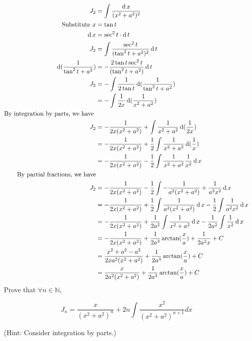 \documentclass{homework}
\newcommand{\?}{\stackrel{?}{=}}
\theoremstyle{definition}
\begin{document}
\begin{align*}
    J_2 &=\int \frac{\operatorname{d} x}{(x^2+a^2)^2}\\
    \text{Substitute } x&=\tan t\\
    \operatorname{d} x&=\sec^2 t \cdot \operatorname{d} t\\
    J_2&=\int \frac{\sec^2 t}{(\tan^2 t + a^2)^2}\operatorname{d} t\\
    \operatorname{d} (\frac{1}{\tan^2 t + a^2}) &= -\frac{2\tan t\sec^2 t}{(\tan^2 t + a^2)}\operatorname{d} t\\
    J_2&=-\int \frac{1}{2\tan t}\operatorname{d} (\frac{1}{\tan^2 t + a^2})\\
    &=-\int \frac{1}{2x}\operatorname{d} (\frac{1}{x^2+a^2})\\
    \text{By integration by parts, we have }&\\
    J_2&=-\frac{1}{2x(x^2+a^2)}+\int \frac{1}{x^2+a^2}\operatorname{d} (\frac{1}{2x})\\
    &=-\frac{1}{2x(x^2+a^2)}+\frac{1}{2}\int \frac{1}{x^2+a^2}\operatorname{d} (\frac{1}{x})\\
    &=-\frac{1}{2x(x^2+a^2)}-\frac{1}{2}\int \frac{1}{x^2+a^2}\frac{1}{x^2}\operatorname{d} x\\
    \text{By partial fractions, we have}\\
    J_2&=-\frac{1}{2x(x^2+a^2)}-\frac{1}{2}\int -\frac{1}{a^2(x^2+a^2)}+\frac{1}{a^2x^2}\operatorname{d} x\\
    &=-\frac{1}{2x(x^2+a^2)}+\frac{1}{2}\int \frac{1}{a^2(x^2+a^2)}\operatorname{d} x -\frac{1}{2}\int\frac{1}{a^2x^2}\operatorname{d} x\\
    &=-\frac{1}{2x(x^2+a^2)}+\frac{1}{2a^2}\int \frac{1}{x^2+a^2}\operatorname{d} x -\frac{1}{2a^2}\int\frac{1}{x^2}\operatorname{d} x\\
    &=-\frac{1}{2x(x^2+a^2)}+\frac{1}{2a^3}\arctan(\frac{x}a) +\frac{1}{2a^2 x} + C\\
    &=\frac{x^2+a^2-a^2}{2xa^2(x^2+a^2)}+\frac{1}{2a^3}\arctan(\frac{x}a) + C\\
    &=\frac{x}{2a^2(x^2+a^2)}+\frac{1}{2a^3}\arctan(\frac{x}a) + C\\
\end{align*}
\newpage
\question Prove that $\forall n \in \mathbb{N}$,

$$
J_{n}=\frac{x}{\left(x^{2}+a^{2}\right)^{n}}+2 n \int \frac{x^{2}}{\left(x^{2}+a^{2}\right)^{n+1}} d x
$$

(Hint: Consider integration by parts.)
\end{document}
